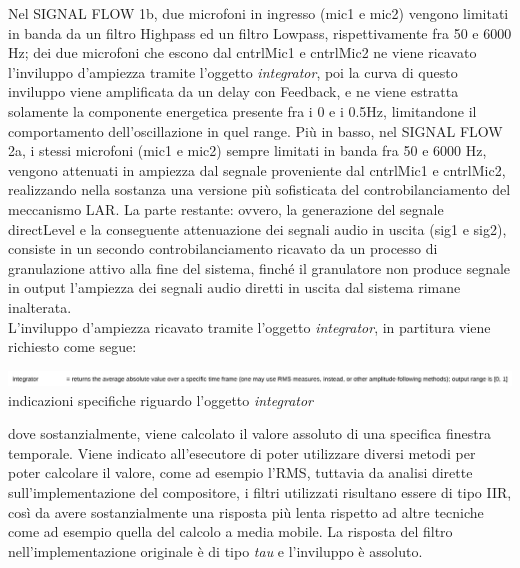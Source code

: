 Nel SIGNAL FLOW 1b,
due microfoni in ingresso (mic1 e mic2) vengono limitati in banda da un filtro Highpass ed 
un filtro Lowpass, rispettivamente fra 50 e 6000 Hz; dei due microfoni che escono 
dal cntrlMic1 e cntrlMic2 ne viene ricavato l'inviluppo d'ampiezza tramite
l'oggetto \textit{integrator}, poi la curva di questo inviluppo viene amplificata da 
un delay con Feedback, e ne viene estratta solamente la componente energetica 
presente fra i 0 e i 0.5Hz, limitandone il comportamento dell'oscillazione in quel range.
Più in basso, nel SIGNAL FLOW 2a, i stessi microfoni (mic1 e mic2) sempre
limitati in banda fra 50 e 6000 Hz, vengono attenuati in ampiezza dal segnale
proveniente dal cntrlMic1 e cntrlMic2, realizzando nella sostanza una 
versione più sofisticata del controbilanciamento del meccanismo LAR.
La parte restante: ovvero, la generazione del segnale directLevel e la 
conseguente attenuazione dei segnali audio in uscita (sig1 e sig2),
consiste in un secondo controbilanciamento ricavato da un processo di granulazione
attivo alla fine del sistema, finché il granulatore non produce segnale in output 
l'ampiezza dei segnali audio diretti in uscita dal sistema rimane inalterata. \\
L'inviluppo d'ampiezza ricavato tramite l'oggetto \textit{integrator}, in partitura 
viene richiesto come segue:

\begin{center}
    \includegraphics[width=14cm]{figures/integratorae2.pdf} \\
    {indicazioni specifiche riguardo l'oggetto \textit{integrator}} \\
    \vspace{0.5cm}
    \end{center}

dove sostanzialmente, viene calcolato il valore assoluto di una specifica finestra temporale. 
Viene indicato all'esecutore di poter utilizzare diversi metodi per poter calcolare il valore, come ad esempio l'RMS, 
tuttavia da analisi dirette sull'implementazione del compositore, i filtri utilizzati risultano essere di tipo IIR,
così da avere sostanzialmente una risposta più lenta rispetto ad altre tecniche come ad esempio quella del calcolo a media mobile.  
La risposta del filtro nell'implementazione originale è di tipo \textit{tau} e l'inviluppo è assoluto.